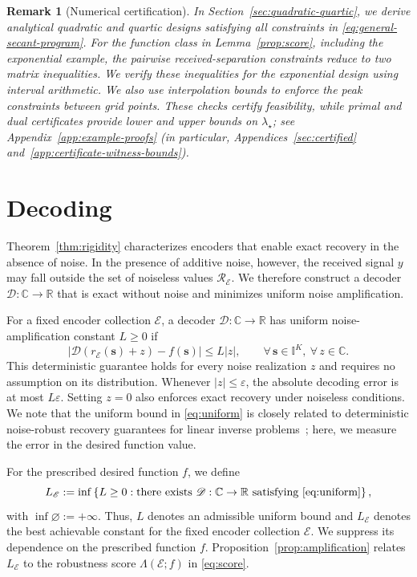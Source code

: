 \documentclass[journal,12pt,onecolumn,draftclsnofoot]{IEEEtran}
\newtheorem{remark}{Remark}
\newcommand{\enc}{\mathscr{E}}\newcommand{\dec}{\mathscr{D}}\newcommand{\R}{\mathbb R}\newcommand{\C}{\mathbb C}
\begin{document}
\begin{remark}[Numerical certification]\label{remark:certification}
In Section~\ref{sec:quadratic-quartic}, we derive analytical
quadratic and quartic designs satisfying all constraints in
\eqref{eq:general-secant-program}. For the function class in Lemma~\ref{prop:score}, including the exponential example, the pairwise received-separation constraints reduce to two matrix inequalities. We verify these inequalities for the exponential design using interval arithmetic. We also use interpolation bounds to enforce the
peak constraints between grid points. These checks certify
feasibility, while primal and dual certificates provide lower
and upper bounds on $\lambda_\star$; see Appendix~\ref{app:example-proofs} (in particular, Appendices~\ref{sec:certified} and~\ref{app:certificate-witness-bounds}).
\end{remark}




\section{Decoding}\label{sec:decoding}


Theorem~\ref{thm:rigidity} characterizes encoders that enable exact recovery in the absence of noise. In the presence of additive noise, however, the received signal $y$ may fall outside the set of noiseless values $\mathcal R_\enc$. We therefore construct a decoder $\dec:\C\to\R$ that is exact without noise and minimizes uniform noise amplification. 

For a fixed encoder collection $\enc$, a decoder $\dec:\C\to\R$ has uniform noise-amplification constant $L\ge0$ if
\begin{equation}
|\dec(r_\enc(\boldsymbol s)+z)-f(\boldsymbol s)|
\le L|z|,
\qquad
\forall\,\boldsymbol s\in\mathbb I^K,\ \forall\,z\in\C.
\label{eq:uniform}
\end{equation}
This deterministic guarantee holds for every noise realization $z$ and requires no assumption on its distribution. Whenever $|z|\le\varepsilon$, the absolute decoding error is at most $L\varepsilon$. Setting $z=0$ also enforces exact recovery under noiseless conditions. We note that the uniform bound in \eqref{eq:uniform} is closely related to deterministic noise-robust recovery guarantees for linear inverse problems~\cite{bourrier2014fundamental}; here, we measure the error in the desired function value.


For the prescribed desired function $f$, we define
$$
L_\enc:=\inf\left\{L\ge0:
\text{there exists }\dec:\C\to\R
\text{ satisfying }\eqref{eq:uniform}\right\},
$$
with $\inf\varnothing:=+\infty$. Thus, $L$ denotes an admissible
uniform bound and $L_\enc$ denotes the best achievable constant
for the fixed encoder collection $\enc$. We suppress its dependence on the
prescribed function $f$. Proposition~\ref{prop:amplification}
relates $L_\enc$ to the robustness score $\Lambda(\enc;f)$ in \eqref{eq:score}.
\end{document}
